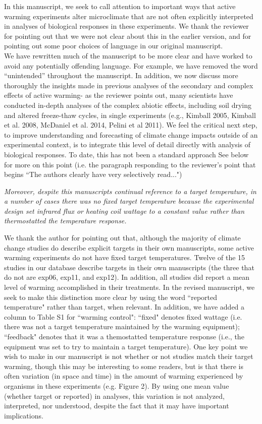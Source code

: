 \documentclass[11pt,a4paper]{letter}
\begin{document}
In this manuscript, we seek to call attention to important ways that active warming experiments alter microclimate that are not often explicitly interpreted in analyses of biological responses in these experiments. We thank the reviewer for pointing out that we were not clear about this in the earlier version, and for pointing out some poor choices of language in our original manuscript. \\

We have rewritten much of the manuscript to be more clear and have worked to avoid any potentially offending language. For example, we have removed the word ``unintended'' throughout the manuscript. In addition, we now discuss more thoroughly the insights made in previous analyses of the secondary and complex effects of active warming- as the reviewer points out, many scientists have conducted in-depth analyses of the complex abiotic effects, including soil drying and altered freeze-thaw cycles, in single experiments (e.g., Kimball 2005, Kimball et al. 2008, McDaniel et al. 2014, Pelini et al 2011). We feel the critical next step, to improve understanding and  forecasting of climate change impacts outside of an experimental context, is to integrate this level of detail directly with analysis of biological responses. To date, this has not been a standard approach See below for more on this point (i.e. the paragraph responding to the reviewer's point that begins ``The authors clearly have very selectively read...")

\par \emph{Moreover, despite this manuscripts continual reference to a target temperature, in a number of cases there  was no fixed target temperature because the experimental design set infrared flux or heating coil wattage to a constant value rather than thermostatted the temperature response.}
\par We thank the author for pointing out that, although the majority of climate change studies do describe explicit targets in their own manuscripts, some active warming experiments do not have fixed target temperatures. Twelve of the 15 studies in our database describe targets in their own manuscripts (the three that do not are exp06, exp11, and exp12). In addition, all studies did report a mean level of warming accomplished in their treatments. In the revised manuscript, we seek to make this distinction  more clear by  using the word ``reported temperature" rather than target, when relevant. In addition, we have added a column to Table S1 for ``warming control": ``fixed" denotes fixed wattage (i.e. there was not a target temperature maintained by the warming equipment); ``feedback" denotes that it was a themostatted temperature response (i.e., the equipment was set to try to maintain a target temperature). One key point we wish to make in our manuscript is not whether or not studies match their target warming, though this may be interesting to some readers, but is that there is often variation (in space and time) in the amount of warming experienced by organisms in these experiments (e.g. Figure 2). By using one mean value (whether target or reported) in analyses, this variation is not analyzed, interpreted, nor understood, despite the fact that it may have important implications.
\end{document}
